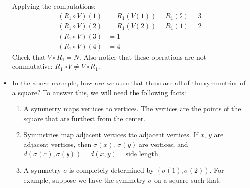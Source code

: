 \begin{itemize}
\begin{example}
\begin{center}
        \end{center}
        Applying the computations:
        \begin{align}
            (R_1 \circ V)(1) &= R_1(V(1)) = R_1(2) = 3 \\ 
            (R_1 \circ V)(2) &= R_1(V(2)) = R_1(1) = 2 \\ 
            (R_1 \circ V)(3) &= 1 \\ 
            (R_1 \circ V)(4) &= 4
        \end{align}
        Check that $V \circ R_1 = N$. Also notice that these operations are not commutative: $R_1 \circ V \neq V \circ R_1$.
    \end{example}
    \item In the above example, how are we sure that these are all of the symmetries of a square? To answer this, we will need the following facts:
    \begin{enumerate}
        \item A symmetry maps vertices to vertices. The vertices are the points of the square that are furthest from the center.
        \item Symmetries map adjacent vertices tto adjacent vertices. If $x$, $y$ are adjacent vertices, then $\sigma(x)$, $\sigma(y)$ are vertices, and $d(\sigma(x),\sigma(y))=d(x,y)=\text{side length}$.
        \item A symmetry $\sigma$ is completely determined by $(\sigma(1), \sigma(2))$. For example, suppose we have the symmetry $\sigma$ on a square such that:
        \begin{center}
\end{center}
\end{enumerate}
\end{itemize}
